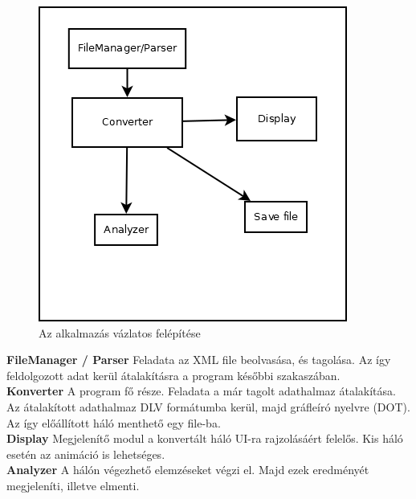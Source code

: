 \begin{figure}[h!]
\centering
\includegraphics[scale=0.6]{images/scheme.png}
\caption{Az alkalmazás vázlatos felépítése}
\label{fig:scheme}
\end{figure}

\textbf{FileManager / Parser } Feladata az XML file beolvasása, és tagolása. Az így feldolgozott adat kerül átalakításra a program későbbi szakaszában.\\
\textbf{Konverter} A program fő része. Feladata a már tagolt adathalmaz átalakítása. Az átalakított adathalmaz DLV formátumba kerül, majd gráfleíró nyelvre (DOT). Az így előállított háló menthető egy file-ba.\\
\textbf{Display} Megjelenítő modul a konvertált háló UI-ra rajzolásáért felelős. Kis háló esetén az animáció is lehetséges.\\
\textbf{Analyzer} A hálón végezhető elemzéseket végzi el. Majd ezek eredményét megjeleníti, illetve elmenti. 

